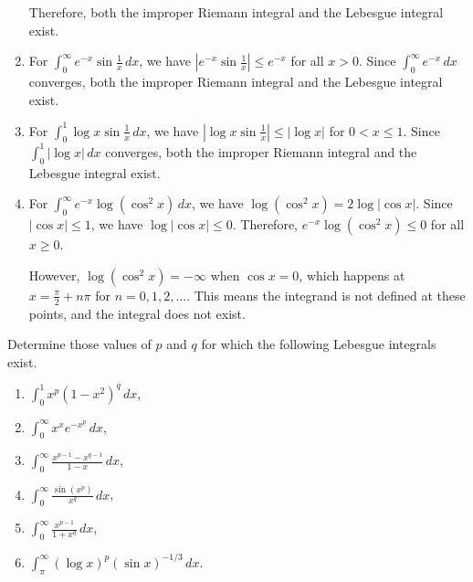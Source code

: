 \begin{enumerate}[label=(\alph*)]
    Therefore, both the improper Riemann integral and the Lebesgue integral exist.
    
    \item For $\int_{0}^{\infty} e^{-x} \sin \frac{1}{x} \, dx$, we have $|e^{-x} \sin \frac{1}{x}| \leq e^{-x}$ for all $x > 0$. Since $\int_{0}^{\infty} e^{-x} \, dx$ converges, both the improper Riemann integral and the Lebesgue integral exist.
    
    \item For $\int_{0}^{1} \log x \sin \frac{1}{x} \, dx$, we have $|\log x \sin \frac{1}{x}| \leq |\log x|$ for $0 < x \leq 1$. Since $\int_{0}^{1} |\log x| \, dx$ converges, both the improper Riemann integral and the Lebesgue integral exist.
    
    \item For $\int_{0}^{\infty} e^{-x} \log (\cos^2 x) \, dx$, we have $\log (\cos^2 x) = 2 \log |\cos x|$. Since $|\cos x| \leq 1$, we have $\log |\cos x| \leq 0$. Therefore, $e^{-x} \log (\cos^2 x) \leq 0$ for all $x \geq 0$.
    
    However, $\log (\cos^2 x) = -\infty$ when $\cos x = 0$, which happens at $x = \frac{\pi}{2} + n\pi$ for $n = 0, 1, 2, \ldots$. This means the integrand is not defined at these points, and the integral does not exist.
\end{enumerate}

\begin{problembox}
Determine those values of $p$ and $q$ for which the following Lebesgue integrals exist.
\begin{enumerate}[label=(\alph*)]
    \item $\int_{0}^{1} x^p (1 - x^2)^q \, dx$,
    \item $\int_{0}^{\infty} x^x e^{-x^p} \, dx$,
    \item $\int_{0}^{\infty} \frac{x^{p-1} - x^{q-1}}{1 - x} \, dx$,
    \item $\int_{0}^{\infty} \frac{\sin(x^p)}{x^q} \, dx$,
    \item $\int_{0}^{\infty} \frac{x^{p-1}}{1 + x^q} \, dx$,
    \item $\int_{\pi}^{\infty} (\log x)^p (\sin x)^{-1/3} \, dx$.
\end{enumerate}
\end{problembox}

